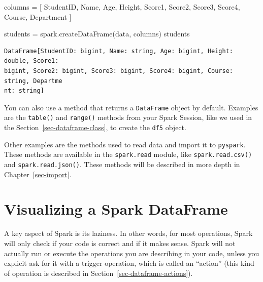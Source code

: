 \documentclass[
  11pt,
  letterpaper,
  DIV=11,
  numbers=noendperiod]{scrreprt}
\newenvironment{Shaded}{\begin{snugshade}}{\end{snugshade}}
\newcommand{\NormalTok}[1]{\textcolor[rgb]{0.00,0.23,0.31}{#1}}
\newcommand{\OperatorTok}[1]{\textcolor[rgb]{0.37,0.37,0.37}{#1}}
\newcommand{\StringTok}[1]{\textcolor[rgb]{0.13,0.47,0.30}{#1}}
\begin{document}
\begin{Shaded}
\begin{Highlighting}[]
\NormalTok{columns }\OperatorTok{=}\NormalTok{ [}
  \StringTok{\textquotesingle{}StudentID\textquotesingle{}}\NormalTok{, }\StringTok{\textquotesingle{}Name\textquotesingle{}}\NormalTok{, }\StringTok{\textquotesingle{}Age\textquotesingle{}}\NormalTok{, }\StringTok{\textquotesingle{}Height\textquotesingle{}}\NormalTok{, }\StringTok{\textquotesingle{}Score1\textquotesingle{}}\NormalTok{,}
  \StringTok{\textquotesingle{}Score2\textquotesingle{}}\NormalTok{, }\StringTok{\textquotesingle{}Score3\textquotesingle{}}\NormalTok{, }\StringTok{\textquotesingle{}Score4\textquotesingle{}}\NormalTok{, }\StringTok{\textquotesingle{}Course\textquotesingle{}}\NormalTok{, }\StringTok{\textquotesingle{}Department\textquotesingle{}}
\NormalTok{]}

\NormalTok{students }\OperatorTok{=}\NormalTok{ spark.createDataFrame(data, columns)}
\NormalTok{students}
\end{Highlighting}
\end{Shaded}

\begin{verbatim}
DataFrame[StudentID: bigint, Name: string, Age: bigint, Height: double, Score1: 
bigint, Score2: bigint, Score3: bigint, Score4: bigint, Course: string, Departme
nt: string]
\end{verbatim}

You can also use a method that returns a \texttt{DataFrame} object by
default. Examples are the \texttt{table()} and \texttt{range()} methods
from your Spark Session, like we used in the
Section~\ref{sec-dataframe-class}, to create the \texttt{df5} object.

Other examples are the methods used to read data and import it to
\texttt{pyspark}. These methods are available in the \texttt{spark.read}
module, like \texttt{spark.read.csv()} and \texttt{spark.read.json()}.
These methods will be described in more depth in
Chapter~\ref{sec-import}.

\hypertarget{sec-viewing-a-dataframe}{%
\section{Visualizing a Spark DataFrame}\label{sec-viewing-a-dataframe}}

A key aspect of Spark is its laziness. In other words, for most
operations, Spark will only check if your code is correct and if it
makes sense. Spark will not actually run or execute the operations you
are describing in your code, unless you explicit ask for it with a
trigger operation, which is called an ``action'' (this kind of operation
is described in Section~\ref{sec-dataframe-actions}).
\end{document}
